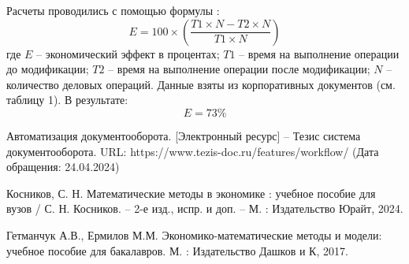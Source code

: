 Расчеты проводились с помощью формулы  \cite{Kosnikov}:
\[
E = 100 \times \left(\frac{{T1 \times N - T2 \times N}}{{T1 \times N}}\right)
\]
где \(E\) -- экономический эффект в процентах;
\(T1\) -- время на выполнение операции до модификации;
\(T2\) -- время на выполнение операции после модификации;
\(N\) -- количество деловых операций. Данные взяты из корпоративных документов  (см. таблицу 1). В результате:
\[
E =  73\%
\]

\begin{thebibliography}{9}

 Автоматизация документооборота. [Электронный ресурс] -- Тезис система документооборота. URL: https://www.tezis-doc.ru/features/workflow/ (Дата обращения: 24.04.2024)

Косников, С. Н.  Математические методы в экономике : учебное пособие для вузов / С. Н. Косников. -- 2-е изд., испр. и доп. -- М. : Издательство Юрайт, 2024.

Гетманчук А.В., Ермилов М.М. Экономико-математические методы и модели: учебное пособие для бакалавров. М. :
Издательство Дашков и К, 2017.
\end{thebibliography}





%
